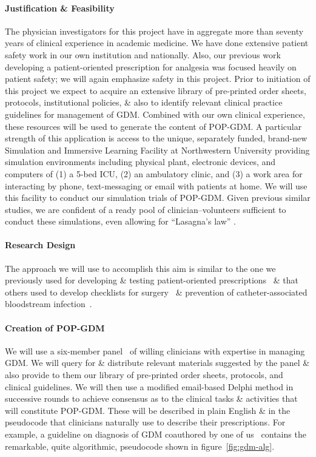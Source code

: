 \paragraph{Justification \& Feasibility}
The physician investigators for this project have in aggregate more
than seventy years of clinical experience in academic medicine. We
have done extensive patient safety work in our own institution and
nationally. Also, our previous work developing a patient-oriented
prescription for analgesia was focused heavily on patient safety; we
will again emphasize safety in this project. Prior to initiation of
this project we expect to acquire an extensive library of pre-printed
order sheets, protocols, institutional policies, \& also to identify
relevant clinical practice guidelines for management of GDM. Combined
with our own clinical experience, these resources will be used to
generate the content of POP-GDM. A particular strength of this
application is access to the unique, separately funded, brand-new
Simulation and Immersive Learning Facility at Northwestern University
providing simulation environments including physical plant, electronic
devices, and computers of (1) a 5-bed ICU, (2) an ambulatory clinic,
and (3) a work area for interacting by phone, text-messaging or email
with patients at home. We will use this facility to conduct our
simulation trials of POP-GDM. 
Given previous similar studies, we are confident of a ready
pool of clinician–volunteers sufficient to conduct these simulations, even
allowing for ``Lasagna's law'' \citep{Wouden2007}.

\paragraph{Research Design}
The approach we will use to accomplish this aim is similar to the one
we previously used for developing \& testing patient-oriented
prescriptions~\citep{Belknap2008, GraumlichBelknap2000} \& that others
used to develop checklists for surgery~\citep{HaynesGawande2009} \&
prevention of catheter-associated bloodstream infection~\citep{Pronovost2006}.

\paragraph{Creation of POP-GDM}
We will use a six-member panel~\citep{Libby2010} of willing clinicians with
expertise in managing GDM. We will query for \& distribute relevant
materials suggested by the panel \& also provide to them our library
of pre-printed order sheets, protocols, and clinical guidelines. We
will then use a modified email-based Delphi method in successive
rounds to achieve consensus as to the clinical tasks \& activities
that will constitute POP-GDM. These will be described in plain English
\& in the pseudocode that clinicians naturally use to describe their
prescriptions. For example, a guideline on diagnosis of GDM coauthored
by one of us~\citep{Metzger2010} contains the remarkable, quite
algorithmic, pseudocode shown in figure~\ref{fig:gdm-alg}.


